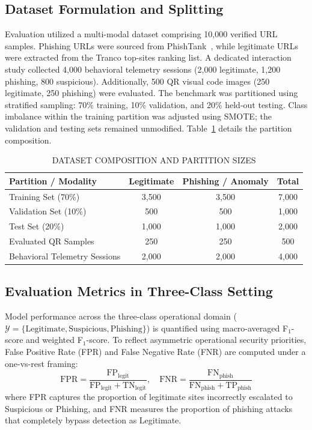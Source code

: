 \documentclass[conference]{IEEEtran}
\begin{document}
\subsection{Dataset Formulation and Splitting}
Evaluation utilized a multi-modal dataset comprising 10,000 verified URL samples.
Phishing URLs were sourced from PhishTank~\cite{ref18}, while legitimate URLs were extracted from the
Tranco top-sites ranking list.
A dedicated interaction study collected 4,000 behavioral telemetry sessions (2,000 legitimate,
1,200 phishing, 800 suspicious).
Additionally, 500 QR visual code images (250 legitimate, 250 phishing) were evaluated.
The benchmark was partitioned using stratified sampling: 70\% training, 10\% validation, and 20\%
held-out testing.
Class imbalance within the training partition was adjusted using SMOTE; the validation and testing sets
remained unmodified.
Table~\ref{tab:data} details the partition composition.

\begin{table}[!t]
\caption{DATASET COMPOSITION AND PARTITION SIZES}
\label{tab:data}
\centering
\scriptsize
\setlength{\tabcolsep}{4pt}
\begin{tabular}{|l|c|c|c|}
\hline
\textbf{Partition / Modality} & \textbf{Legitimate} & \textbf{Phishing / Anomaly} & \textbf{Total} \\ \hline
Training Set (70\%)            & 3,500 & 3,500 & 7,000 \\ \hline
Validation Set (10\%)          & 500   & 500   & 1,000 \\ \hline
Test Set (20\%)                & 1,000 & 1,000 & 2,000 \\ \hline
Evaluated QR Samples           & 250   & 250   & 500   \\ \hline
Behavioral Telemetry Sessions  & 2,000 & 2,000 & 4,000 \\ \hline
\end{tabular}
\end{table}

\subsection{Evaluation Metrics in Three-Class Setting}
Model performance across the three-class operational domain ($\mathcal{Y} = \{\text{Legitimate},
\text{Suspicious}, \text{Phishing}\}$) is quantified using macro-averaged F$_1$-score and weighted F$_1$-score.
To reflect asymmetric operational security priorities, False Positive Rate (FPR) and False Negative Rate (FNR)
are computed under a one-vs-rest framing:
\begin{equation}
  \text{FPR} = \frac{\text{FP}_{\text{legit}}}{\text{FP}_{\text{legit}} + \text{TN}_{\text{legit}}}, \quad
  \text{FNR} = \frac{\text{FN}_{\text{phish}}}{\text{FN}_{\text{phish}} + \text{TP}_{\text{phish}}}
\end{equation}
where FPR captures the proportion of legitimate sites incorrectly escalated to Suspicious or Phishing,
and FNR measures the proportion of phishing attacks that completely bypass detection as Legitimate.
\end{document}
